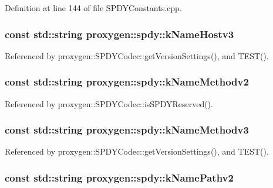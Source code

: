 Definition at line 144 of file S\+P\+D\+Y\+Constants.\+cpp.

\subsubsection[{k\+Name\+Hostv3}]{\setlength{\rightskip}{0pt plus 5cm}const std\+::string proxygen\+::spdy\+::k\+Name\+Hostv3}\label{namespaceproxygen_1_1spdy_a9647ead2ae5255c530962632d3731570}


Referenced by proxygen\+::\+S\+P\+D\+Y\+Codec\+::get\+Version\+Settings(), and T\+E\+S\+T().

\subsubsection[{k\+Name\+Methodv2}]{\setlength{\rightskip}{0pt plus 5cm}const std\+::string proxygen\+::spdy\+::k\+Name\+Methodv2}\label{namespaceproxygen_1_1spdy_a89fc028420cae8a8a26666dc96e36567}


Referenced by proxygen\+::\+S\+P\+D\+Y\+Codec\+::is\+S\+P\+D\+Y\+Reserved().

\subsubsection[{k\+Name\+Methodv3}]{\setlength{\rightskip}{0pt plus 5cm}const std\+::string proxygen\+::spdy\+::k\+Name\+Methodv3}\label{namespaceproxygen_1_1spdy_af41ab4fcf60b0d017c7665024baa74bf}


Referenced by proxygen\+::\+S\+P\+D\+Y\+Codec\+::get\+Version\+Settings(), and T\+E\+S\+T().

\subsubsection[{k\+Name\+Pathv2}]{\setlength{\rightskip}{0pt plus 5cm}const std\+::string proxygen\+::spdy\+::k\+Name\+Pathv2}\label{namespaceproxygen_1_1spdy_a6a467400545ca9959f70808b470d0044}


